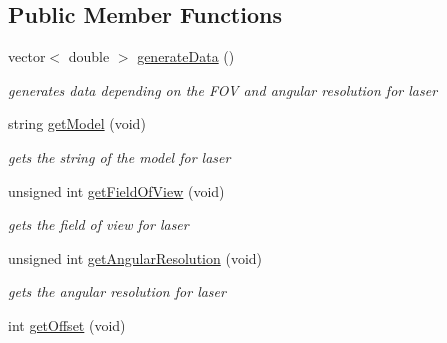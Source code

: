 \subsection*{Public Member Functions}
\begin{DoxyCompactItemize}
\item 
vector$<$ double $>$ \hyperlink{classLaser_af5345ed85a07caa86c52b19d7eff738e}{generate\+Data} ()\hypertarget{classLaser_af5345ed85a07caa86c52b19d7eff738e}{}\label{classLaser_af5345ed85a07caa86c52b19d7eff738e}

\begin{DoxyCompactList}\small\item\em generates data depending on the F\+OV and angular resolution for laser \end{DoxyCompactList}\item 
string \hyperlink{classLaser_ae0d6251839324eb65a7c06605a79adf2}{get\+Model} (void)\hypertarget{classLaser_ae0d6251839324eb65a7c06605a79adf2}{}\label{classLaser_ae0d6251839324eb65a7c06605a79adf2}

\begin{DoxyCompactList}\small\item\em gets the string of the model for laser \end{DoxyCompactList}\item 
unsigned int \hyperlink{classLaser_a65ef9cdae59880120965e4a2ae9a927f}{get\+Field\+Of\+View} (void)\hypertarget{classLaser_a65ef9cdae59880120965e4a2ae9a927f}{}\label{classLaser_a65ef9cdae59880120965e4a2ae9a927f}

\begin{DoxyCompactList}\small\item\em gets the field of view for laser \end{DoxyCompactList}\item 
unsigned int \hyperlink{classLaser_a8cca3c1ff26bd1c021017bda97bd32be}{get\+Angular\+Resolution} (void)\hypertarget{classLaser_a8cca3c1ff26bd1c021017bda97bd32be}{}\label{classLaser_a8cca3c1ff26bd1c021017bda97bd32be}

\begin{DoxyCompactList}\small\item\em gets the angular resolution for laser \end{DoxyCompactList}\item 
int \hyperlink{classLaser_a68d52b516007a7762b5089913e7d6a5b}{get\+Offset} (void)\hypertarget{classLaser_a68d52b516007a7762b5089913e7d6a5b}{}\label{classLaser_a68d52b516007a7762b5089913e7d6a5b}


\end{DoxyCompactItemize}
